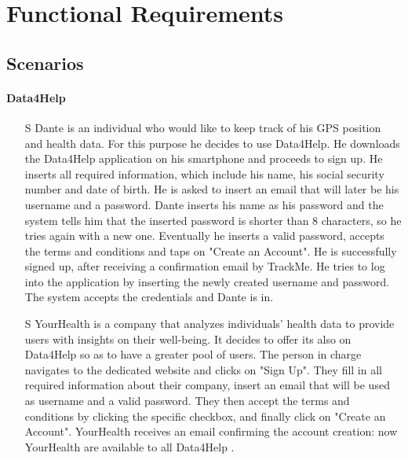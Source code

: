 \documentclass[../../rasd.tex]{subfiles}
\begin{document}
\section{Functional Requirements}

		\subsection{Scenarios}
            \paragraph{Data4Help}
                \begin{itemize}
                    
                    \item[S\subs{1}] Dante is an individual who would like to keep track of his GPS position and health data. For this purpose he decides to use Data4Help. He downloads the Data4Help application on his smartphone and proceeds to sign up. He inserts all required information, which include his name, his social security number and date of birth. He is asked to insert an email that will later be his username and a password. Dante inserts his name as his password and the system tells him that the inserted password is shorter than 8 characters, so he tries again with a new one. Eventually he inserts a valid password, accepts the terms and conditions and taps on "Create an Account". He is successfully signed up, after receiving a confirmation email by TrackMe. He tries to log into the application by inserting the newly created username and password. The system accepts the credentials and Dante is in.
                    
                    \item[S\subs{2}] YourHealth is a company that analyzes individuals' health data to provide users with insights on their well-being. It decides to offer its  also on Data4Help so as to have a greater pool of users. The person in charge navigates to the  dedicated website and clicks on "Sign Up". They fill in all required information about their company, insert an email that will be used as username and a valid password. They then accept the terms and conditions by clicking the specific checkbox, and finally click on "Create an Account". YourHealth receives an email confirming the account creation: now YourHealth  are available to all Data4Help .
                    

\end{itemize}
\end{document}
